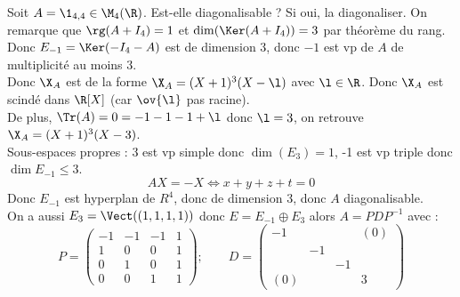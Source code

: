 \documentclass[11pt]{article}
\begin{document}
\begin{exercice}{}{}
    Soit $A=\1_{4,4}\in\M_4(\R)$. Est-elle diagonalisable ? Si oui, la diagonaliser.
    \tcblower
    On remarque que $\rg(A+I_4)=1$ et $\dim(\Ker(A+I_4))=3$ par théorème du rang.\\
    Donc $E_{-1}=\Ker(-I_4-A)$ est de dimension 3, donc $-1$ est vp de $A$ de multiplicité au moins 3.\\
    Donc $\X_A$ est de la forme $\X_A=(X+1)^3(X-\l)$ avec $\l\in\R$. Donc $\X_A$ est scindé dans $\R[X]$ (car $\ov{\l}$ pas racine).\\
    De plus, $\Tr(A)=0=-1-1-1+\l$ donc $\l=3$, on retrouve $\X_A=(X+1)^3(X-3)$.\\
    Sous-espaces propres : $3$ est vp simple donc $\dim(E_3)=1$, -1 est vp triple donc $\dim E_{-1}\leq 3$.
    \begin{equation*}
        AX=-X \iff x+y+z+t=0
    \end{equation*}
    Donc $E_{-1}$ est hyperplan de $R^4$, donc de dimension 3, donc $A$ diagonalisable.\\
    On a aussi $E_3=\Vect((1,1,1,1))$ donc $E=E_{-1}\oplus E_3$ alors $A=PDP^{-1}$ avec :
    \begin{equation*}
        P=\begin{pmatrix}
            -1&-1&-1&1\\1&0&0&1\\0&1&0&1\\ 0&0&1&1
        \end{pmatrix}; \qquad D = \begin{pmatrix}-1&&&(0)\\&-1&&\\&&-1&\\(0)&&&3\end{pmatrix}
    \end{equation*} 
\end{exercice}
\end{document}
